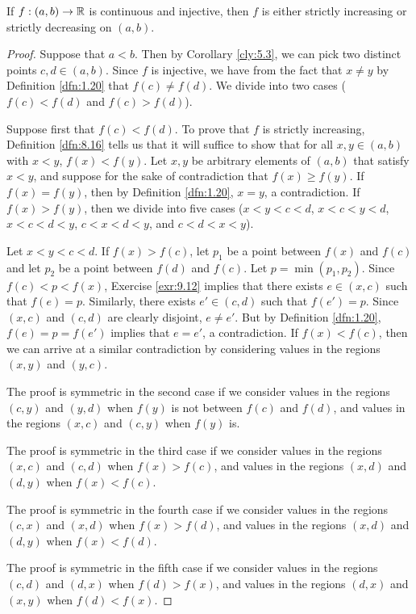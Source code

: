 \documentclass[../main.tex]{subfiles}
\begin{document}
\begin{lemma}\label{lem:9.13}
    If $f:(a,b)\to\mathbb{R}$ is continuous and injective, then $f$ is either strictly increasing or strictly decreasing on $(a,b)$.
    \begin{proof}

        Suppose that $a<b$. Then by Corollary \ref{cly:5.3}, we can pick two distinct points $c,d\in(a,b)$. Since $f$ is injective, we have from the fact that $x\neq y$ by Definition \ref{dfn:1.20} that $f(c)\neq f(d)$. We divide into two cases ($f(c)<f(d)$ and $f(c)>f(d)$).\par\smallskip
        Suppose first that $f(c)<f(d)$. To prove that $f$ is strictly increasing, Definition \ref{dfn:8.16} tells us that it will suffice to show that for all $x,y\in(a,b)$ with $x<y$, $f(x)<f(y)$. Let $x,y$ be arbitrary elements of $(a,b)$ that satisfy $x<y$, and suppose for the sake of contradiction that $f(x)\geq f(y)$. If $f(x)=f(y)$, then by Definition \ref{dfn:1.20}, $x=y$, a contradiction. If $f(x)>f(y)$, then we divide into five cases ($x<y<c<d$, $x<c<y<d$, $x<c<d<y$, $c<x<d<y$, and $c<d<x<y$).\par
        Let $x<y<c<d$. If $f(x)>f(c)$, let $p_1$ be a point between $f(x)$ and $f(c)$ and let $p_2$ be a point between $f(d)$ and $f(c)$. Let $p=\min(p_1,p_2)$. Since $f(c)<p<f(x)$, Exercise \ref{exr:9.12} implies that there exists $e\in(x,c)$ such that $f(e)=p$. Similarly, there exists $e'\in(c,d)$ such that $f(e')=p$. Since $(x,c)$ and $(c,d)$ are clearly disjoint, $e\neq e'$. But by Definition \ref{dfn:1.20}, $f(e)=p=f(e')$ implies that $e=e'$, a contradiction. If $f(x)<f(c)$, then we can arrive at a similar contradiction by considering values in the regions $(x,y)$ and $(y,c)$.\par
        The proof is symmetric in the second case if we consider values in the regions $(c,y)$ and $(y,d)$ when $f(y)$ is not between $f(c)$ and $f(d)$, and values in the regions $(x,c)$ and $(c,y)$ when $f(y)$ is.\par
        The proof is symmetric in the third case if we consider values in the regions $(x,c)$ and $(c,d)$ when $f(x)>f(c)$, and values in the regions $(x,d)$ and $(d,y)$ when $f(x)<f(c)$.\par
        The proof is symmetric in the fourth case if we consider values in the regions $(c,x)$ and $(x,d)$ when $f(x)>f(d)$, and values in the regions $(x,d)$ and $(d,y)$ when $f(x)<f(d)$.\par
        The proof is symmetric in the fifth case if we consider values in the regions $(c,d)$ and $(d,x)$ when $f(d)>f(x)$, and values in the regions $(d,x)$ and $(x,y)$ when $f(d)<f(x)$.
    \end{proof}
\end{lemma}
\end{document}
